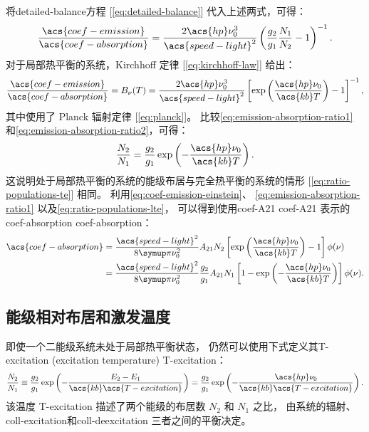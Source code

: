 将\ac{detailed-balance}方程 [\autoref{eq:detailed-balance}]
代入上述两式，可得：
\begin{equation}
  \label{eq:emission-absorption-ratio1}
  \frac{\acs{coef-emission}}{\acs{coef-absorption}}
    = \frac{2 \acs{hp} \nu_0^3}{\acs{speed-light}^2}
      \left( \frac{g_2}{g_1} \frac{N_1}{N_2} - 1 \right)^{-1} .
\end{equation}
对于局部热平衡的系统，Kirchhoff 定律 [\autoref{eq:kirchhoff-law}] 给出：
\begin{equation}
  \label{eq:emission-absorption-ratio2}
  \frac{\acs{coef-emission}}{\acs{coef-absorption}}
    = B_{\nu}(T)
    = \frac{2 \acs{hp} \nu_0^3}{\acs{speed-light}^2} \left[
      \exp\left( \frac{\acs{hp} \nu_0}{\acs{kb} T} \right) - 1 \right]^{-1} ,
\end{equation}
其中使用了 Planck 辐射定律 [\autoref{eq:planck}]。
比较\autoref{eq:emission-absorption-ratio1}
和\autoref{eq:emission-absorption-ratio2}，可得：
\begin{equation}
  \label{eq:ratio-populations-lte}
  \frac{N_2}{N_1}
    = \frac{g_2}{g_1} \exp\left( -\frac{\acs{hp} \nu_0}{\acs{kb} T} \right) .
\end{equation}
这说明处于局部热平衡的系统的能级布居与完全热平衡的系统的情形
[\autoref{eq:ratio-populations-te}] 相同。
利用\autoref{eq:coef-emission-einstein}、
\autoref{eq:emission-absorption-ratio1}
以及\autoref{eq:ratio-populations-lte}，
可以得到使用\acl{coef-A21} \ac{coef-A21}
表示的\acl{coef-absorption} \acs{coef-absorption}：
\begin{align}
  \acs{coef-absorption}
    & = \frac{\acs{speed-light}^2}{8\Cpi \nu_0^2} A_{21} N_2
      \left[ \exp\left( \frac{\acs{hp} \nu_0}{\acs{kb} T} \right) - 1 \right]
      \phi(\nu)
    \label{eq:coef-absorption-einstein2} \\
    & = \frac{\acs{speed-light}^2}{8\Cpi \nu_0^2} \frac{g_2}{g_1} A_{21} N_1
      \left[ 1 - \exp\left( -\frac{\acs{hp} \nu_0}{\acs{kb} T} \right) \right]
      \phi(\nu) .
    \label{eq:coef-absorption-einstein3}
\end{align}

\subsection{能级相对布居和激发温度}

即使一个二能级系统未处于局部热平衡状态，
仍然可以使用下式定义其\acl{T-excitation} (excitation temperature)
\ac{T-excitation}：
\begin{equation}
  \label{eq:t-excitation-def}
  \frac{N_2}{N_1} \equiv \frac{g_2}{g_1}
    \exp\left(- \frac{E_2-E_1}{\acs{kb} \acs{T-excitation}} \right)
    = \frac{g_2}{g_1}
      \exp\left( -\frac{\acs{hp} \nu_0}{\acs{kb} \acs{T-excitation}} \right) .
\end{equation}
该温度 \acs{T-excitation} 描述了两个能级的布居数 $N_2$ 和 $N_1$ 之比，
由系统的辐射、\ac{coll-excitation}和\ac{coll-deexcitation} 三者之间的平衡决定。

